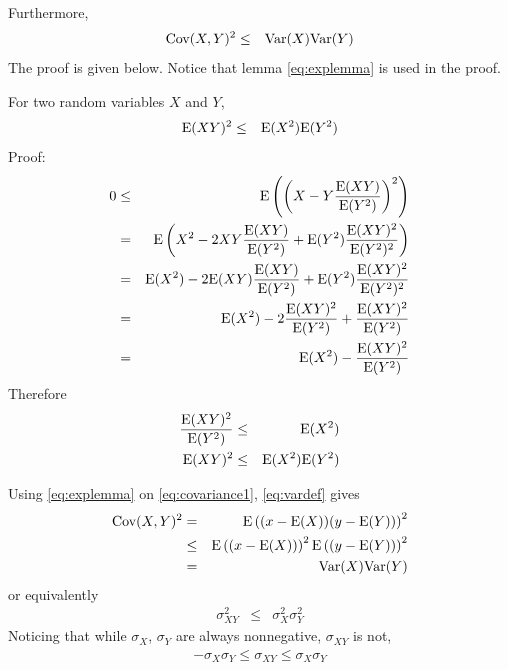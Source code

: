Furthermore,
\begin{eqnarray}
	\textup{Cov}(X, Y)^2 &\leq& \textup{Var}(X)\textup{Var}(Y) \nonumber
\end{eqnarray}
The proof is given below. Notice that lemma \eqref{eq:explemma} is used in the proof.
\begin{mdframed}[frametitle={Lemma}]
	
	For two random variables $X$ and $Y$,
	\begin{eqnarray}
		\textup{E}(XY)^2 &\leq&  \textup{E}(X^2)\textup{E}(Y^2) \label{eq:explemma}
	\end{eqnarray}
	\noindent Proof:
	\begin{eqnarray}
		0 &\leq& \textup{E}\left(\left(X-Y\dfrac{\textup{E}(XY)}{\textup{E}(Y^2)}\right)^2\right) \nonumber \\
		&=& \textup{E}\left(X^2-2XY\dfrac{\textup{E}(XY)}{\textup{E}(Y^2)}+\textup{E}(Y^2)\dfrac{\textup{E}(XY)^2}{\textup{E}(Y^2)^2}\right) \nonumber \\
		&=& \textup{E}(X^2) - 2\textup{E}(XY)\dfrac{\textup{E}(XY)}{\textup{E}(Y^2)} + \textup{E}(Y^2)\dfrac{\textup{E}(XY)^2}{\textup{E}(Y^2)^2} \nonumber \\
		&=& \textup{E}(X^2) - 2\dfrac{\textup{E}(XY)^2}{\textup{E}(Y^2)} + \dfrac{\textup{E}(XY)^2}{\textup{E}(Y^2)} \nonumber \\
		&=& \textup{E}(X^2) - \dfrac{\textup{E}(XY)^2}{\textup{E}(Y^2)} \nonumber
	\end{eqnarray}
	Therefore
	\begin{eqnarray}
		\dfrac{\textup{E}(XY)^2}{\textup{E}(Y^2)} &\leq& \textup{E}(X^2) \nonumber \\
		\textup{E}(XY)^2 &\leq&  \textup{E}(X^2)\textup{E}(Y^2) \nonumber
	\end{eqnarray}
\end{mdframed}
Using \eqref{eq:explemma} on \eqref{eq:covariance1}, \eqref{eq:vardef} gives
\begin{eqnarray}
	\textup{Cov}(X, Y)^2 &=& \textup{E}\left((x - \textup{E}(X))(y - \textup{E}(Y))\right)^2 \nonumber \\
	&\leq& \textup{E}\left((x - \textup{E}(X))\right)^2\textup{E}\left((y - \textup{E}(Y))\right)^2 \nonumber \\
	&=& \textup{Var}(X)\textup{Var}(Y) \nonumber
\end{eqnarray}
or equivalently
\begin{eqnarray}
	\sigma_{XY}^2 &\leq& \sigma_X^2\sigma_Y^2 \nonumber
\end{eqnarray}
Noticing that while $\sigma_X$, $\sigma_Y$ are always nonnegative, $\sigma_{XY}$ is not,
\begin{eqnarray}
	-\sigma_X\sigma_Y \leq \sigma_{XY} \leq \sigma_X\sigma_Y \label{eq:covlemma}
\end{eqnarray}

